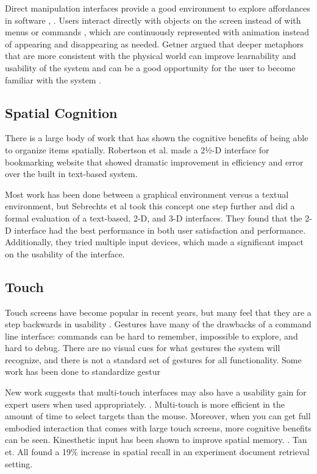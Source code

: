 \documentclass{article}
\begin{document}
Direct manipulation interfaces provide a good environment to explore affordances in software \cite{Gaver1991}, \cite{Norman1991}.  Users interact directly with objects on the screen instead of with menus or commands \cite{Hutchins1989} \cite{Shneiderman1992}, which are continuously represented with animation instead of appearing and disappearing as needed.\cite{Shneiderman1992}  Getner argued that deeper metaphors that are more consistent with the physical world can improve learnability and usability of the system \cite{Gentner1996} and can be a good opportunity for the user to become familiar with the system \cite{Fischer1994}.  


\subsection{Spatial Cognition}
There is a large body of work that has shown the cognitive benefits of being able to organize items spatially. \cite{Agarawala2006} \cite{Robertson1998} Robertson et al. made a 2½-D interface for bookmarking website that showed dramatic improvement in efficiency and error over the built in text-based system.  
	
	Most work has been done between a graphical environment versus a textual environment, but Sebrechts et al took this concept one step further and did a formal evaluation of a text-based, 2-D, and 3-D interfaces.\cite{Sebrechts1999}  They found that the 2-D interface had the best performance in both user satisfaction and performance.  Additionally, they tried multiple input devices, which made a significant impact on the usability of the interface. 

\subsection{Touch}
Touch screens have become popular in recent years, but many feel that they are a step backwards in usability \cite{Norman2010}.  Gestures have many of the drawbacks of a command line interface: commands can be hard to remember, impossible to explore, and hard to debug.  There are no visual cues for what gestures the system will recognize, and there is not a standard set of gestures for all functionality.   Some work has been done to standardize gestur

 
	New work suggests that multi-touch interfaces may also have a usability gain for expert users when used appropriately.  \cite{Forlines2007} \cite{Tan2002}\cite{North2009}.  Multi-touch is more efficient in the amount of time to select targets than the mouse.  Moreover, when you can get full embodied interaction that comes with large touch screens, more cognitive benefits can be seen. Kinesthetic input has been shown to improve spatial memory. \cite{Tan2002}.  Tan et. All found a 19\% increase in spatial recall in an experiment document retrieval setting.  
\end{document}

